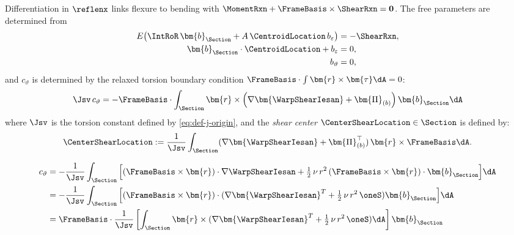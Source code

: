 Differentiation in \(\reflenx\) links flexure to bending with \(\MomentRxn+\FrameBasis\times\ShearRxn=\mathbf{0}\).
The free parameters are determined from
\begin{equation}
\begin{aligned}
E\big(\IntRoR\,\bm{b}_{\Section}+A\,\CentroidLocation\,b_\varepsilon\big)&=-\ShearRxn,\\
\bm{b}_{\Section}\cdot\CentroidLocation+b_\varepsilon&=0,\\
b_\vartheta&=0,
\end{aligned}
\label{eq:2-18}
\end{equation}
and \(c_\vartheta\) is determined by the relaxed torsion boundary condition \(\FrameBasis\cdot\int \bm{r}\times\bm{\tau}\dA = 0\):
\begin{equation}
\Jsv\,c_\vartheta
= -\FrameBasis\cdot\int_{\Section} \bm{r}\times \left(\nabla \bm{\WarpShearIesan}
+ \bm{\Pi}_{(b)} \right)\bm{b}_{\Section} \dA 
\label{eq:iesan-2-22}
\end{equation}
where \(\Jsv\) is the torsion constant defined by \eqref{eq:def-j-origin}, and the \emph{shear center} \(\CenterShearLocation\in\Section\) is defined by:
\begin{equation}
\CenterShearLocation := \frac{1}{\Jsv} \int_\Section (\nabla\bm{\WarpShearIesan} + \bm{\Pi}_{(b)}^\top)\,\bm{r} \times \FrameBasis \dA.
\label{eq:def-shear-center}
\end{equation}

\begin{Details}
\[
\begin{aligned}
c_{\vartheta} &=- \frac{1}{\Jsv}\int_{\Section} \Big[(\FrameBasis\times \bm{r})\cdot \nabla \WarpShearIesan
+ \tfrac{1}{2}\,\nu\, r^2 \,(\FrameBasis\times \bm{r})\cdot \bm{b}_{\Section}\Big]\dA \\
 &=- \frac{1}{\Jsv}\int_{\Section} \Big[(\FrameBasis\times \bm{r})\cdot (\nabla \bm{\WarpShearIesan}^T
+ \tfrac{1}{2}\,\nu\, r^2 \,\oneS) \bm{b}_{\Section}\Big]\dA \\
 &= \FrameBasis\cdot\frac{1}{\Jsv}\left[\int_{\Section} \bm{r}\times (\nabla \bm{\WarpShearIesan}^T
+ \tfrac{1}{2}\,\nu\, r^2 \,\oneS)\dA \right] \bm{b}_{\Section} \\
\end{aligned}
\]
\end{Details}
